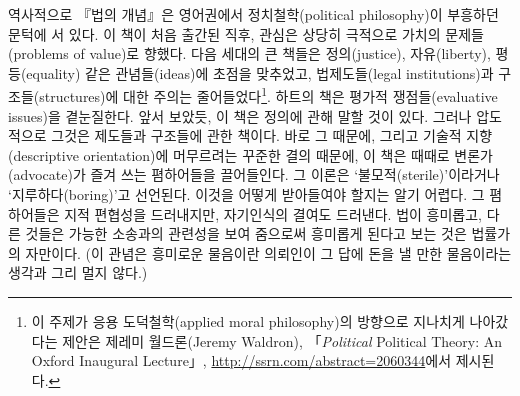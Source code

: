 역사적으로 『법의 개념』은 영어권에서 정치철학(political philosophy)이
부흥하던 문턱에 서 있다. 이 책이 처음 출간된 직후, 관심은 상당히
극적으로 가치의 문제들(problems of value)로 향했다. 다음 세대의 큰
책들은 정의(justice), 자유(liberty), 평등(equality) 같은 관념들(ideas)에
초점을 맞추었고, 법제도들(legal institutions)과 구조들(structures)에
대한 주의는 줄어들었다\footnote{이 주제가 응용 도덕철학(applied moral
  philosophy)의 방향으로 지나치게 나아갔다는 제안은 제레미 월드론(Jeremy
  Waldron), 「\emph{Political} Political Theory: An Oxford Inaugural
  Lecture」, \url{http://ssrn.com/abstract=2060344}에서 제시된다.}.
하트의 책은 평가적 쟁점들(evaluative issues)을 곁눈질한다. 앞서 보았듯,
이 책은 정의에 관해 말할 것이 있다. 그러나 압도적으로 그것은 제도들과
구조들에 관한 책이다. 바로 그 때문에, 그리고 기술적 지향(descriptive
orientation)에 머무르려는 꾸준한 결의 때문에, 이 책은 때때로
변론가(advocate)가 즐겨 쓰는 폄하어들을 끌어들인다. 그 이론은
‘불모적(sterile)’이라거나 ‘지루하다(boring)’고 선언된다. 이것을 어떻게
받아들여야 할지는 알기 어렵다. 그 폄하어들은 지적 편협성을 드러내지만,
자기인식의 결여도 드러낸다. 법이 
흥미롭고, 다른 것들은 가능한 소송과의 관련성을 보여 줌으로써 흥미롭게
된다고 보는 것은 법률가의 자만이다. (이 관념은 
흥미로운 물음이란 의뢰인이 그 답에 돈을 낼 만한 물음이라는 생각과 그리
멀지 않다.)

